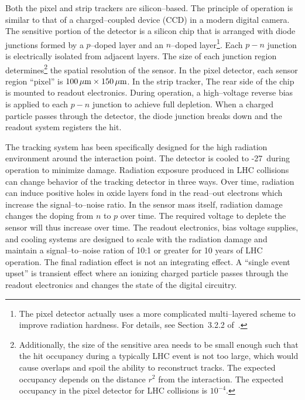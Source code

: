 Both the pixel and strip trackers are silicon--based.  The principle of operation
is similar to that of a charged--coupled device (CCD) 
in a modern digital camera.  The sensitive portion of the detector is a silicon
chip that is arranged with diode junctions formed by a $p$--doped layer and an
$n$--doped layer\footnote{The pixel detector actually uses a more complicated
multi--layered scheme to improve radiation hardness.  For details, see
Section~3.2.2 of~\cite{CMSExperiment}.}.  Each $p-n$ junction is electrically
isolated from adjacent layers. The size of each junction region
determines\footnote{Additionally, the size of the sensitive area needs to be
small enough such that the hit occupancy during a typically LHC event is not too
large, which would cause overlaps and spoil the ability to reconstruct tracks.
The expected occupancy depends on the distance $r^2$ from the interaction.  The
expected occupancy in the pixel detector for LHC collisions is $10^{-4}$.} the
spatial resolution of the sensor.  In the pixel detector, each sensor region
``pixel'' is $100 \,\mu\text{m} \times 150 \,\mu\text{m}$.  In the strip tracker, The rear side of
the chip is mounted to readout electronics.  During operation, a high--voltage
reverse bias is applied to each $p-n$ junction to achieve full depletion.  When
a charged particle passes through the detector, the diode junction breaks down
and the readout system registers the hit.

The tracking system has been specifically designed for the high radiation
environment around the interaction point.  The detector is cooled to
-27\celsius~during operation to minimize damage. Radiation exposure produced in
LHC collisions can change behavior of the tracking detector in three ways.  Over
time, radiation can induce positive holes in oxide layers fond in the read--out
electrons which increase the signal--to--noise ratio.  In the sensor mass
itself, radiation damage changes the doping from $n$ to $p$ over time.  The
required voltage to deplete the sensor will thus increase over time.  The
readout electronics, bias voltage supplies, and cooling systems are designed to
scale with the radiation damage and maintain a signal--to--noise ration of 10:1
or greater for 10 years of LHC operation.  The final radiation effect is not an
integrating effect.  A ``single event upset'' is transient effect where an
ionizing charged particle passes through the readout electronics and changes the
state of the digital circuitry.  

